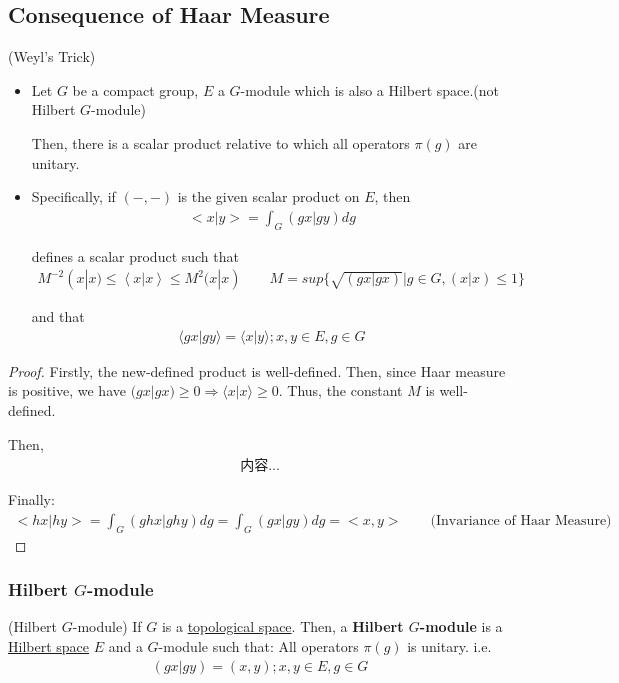 \documentclass[Total.tex]{subfiles}
\begin{document}
			\subsection{Consequence of Haar Measure}
				\begin{theorem}
					(Weyl's Trick) 
					\begin{itemize}
						\item Let $G$ be a compact group, $E$ a $G$-module which is also a Hilbert space.(not Hilbert $G$-module) 
						
						Then, there is a scalar product relative to which all operators $\pi(g)$ are unitary.
						\item Specifically, if $(-,-)$ is the given scalar product on $E$, then
						\begin{gather*}
							<x|y>=\int_G (gx|gy)dg
						\end{gather*}
						
						defines a scalar product such that
						\begin{gather*}
							M^{-2}(x|x)\leq \left\langle x|x\right\rangle \leq M^2(x|x)\qquad M=sup\{\sqrt{(gx|gx)}|g\in G,(x|x)\leq 1\}
						\end{gather*}
						
						and that 
						\begin{gather*}
							\langle gx| gy\rangle=\langle x| y\rangle;x,y\in E,g\in G
						\end{gather*}
					\end{itemize}
				\end{theorem}
				\begin{proof}
					Firstly, the new-defined product is well-defined. Then, since Haar measure is positive, we have $(gx|gx)\geq 0\Rightarrow \langle x|x\rangle\geq 0$. Thus, the constant $M$ is well-defined.
					
					Then,
					\begin{gather*}
						内容...
					\end{gather*}
					
					Finally:
					\begin{gather*}
						<hx|hy>=\int_G (ghx|ghy)dg=\int_G (gx|gy)dg=<x,y>\qquad\mbox{(Invariance of Haar Measure)}
					\end{gather*}
				\end{proof}
				\subsubsection{Hilbert $G$-module}
				\begin{Def}
					(Hilbert $G$-module) If $G$ is a \underline{topological space}. Then, a \textbf{Hilbert $G$-module} is a \underline{Hilbert space} $E$ and a $G$-module such that: All operators $\pi(g)$ is unitary. i.e.
					\begin{gather*}
						(gx|gy)=(x,y);x,y\in E,g\in G
					\end{gather*}
				\end{Def}
				
\end{document}
